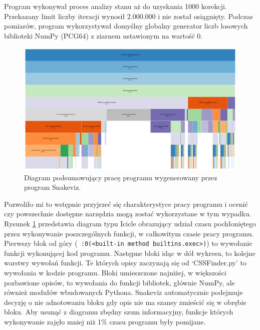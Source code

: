 \documentclass[11pt, a4paper]{article}
\newcommand{\code}[1]{\texttt{#1}}
\begin{document}
\begin{sloppypar}
    Program wykonywał proces analizy stanu aż do uzyskania 1000 korekcji. Przekazany
    limit liczby iteracji wynosił 2.000.000 i nie został osiągnięty. Podczas pomiarów, program
    wykorzystywał domyślny globalny generator liczb losowych biblioteki NumPy (PCG64\cite{NumpyDefaultGenerator})
    z ziarnem ustawionym na wartość 0.

    \FloatBarrier
    \begin{figure}[ht]
      \centering
      \includegraphics[width=1.0\textwidth]{"resources/profiling_1/graph.png"}
      \caption{Diagram podsumowujący pracę programu wygenerowany przez program Snakeviz.}
      \label{pre-prof-perf}
    \end{figure}
    \FloatBarrier

    Pozwoliło mi to wstępnie przyjrzeć się charakterystyce pracy programu i ocenić czy
    powszechnie dostępne narzędzia mogą zostać wykorzystane w tym wypadku. Rysunek \ref{pre-prof-perf}
    przedstawia diagram typu Icicle obrazujący udział czasu pochłoniętego przez wykonywanie
    poszczególnych funkcji, w całkowitym czasie pracy programu. Pierwszy blok od góry (\code{~:0(<built-in method builtins.exec>)})
    to wywołanie funkcji wykonującej kod programu. Następne bloki idąc w dół wykresu, to
    kolejne warstwy wywołań funkcji. Te których opisy zaczynają się od `CSSFinder.py' to
    wywołania w kodzie programu. Bloki umieszczone najniżej, w większości pozbawione opisów,
    to wywołania do funkcji bibliotek, głównie NumPy, ale również modułów wbudowanych
    Pythona. Snakeviz automatycznie podejmuje decyzję o nie adnotowaniu bloku gdy opis nie
    ma szansy zmieścić się w obrębie bloku. Aby usunąć z diagramu zbędny szum
    informacyjny, funkcje których wykonywanie zajęło mniej niż 1\% czasu programu były
    pomijane.


\end{sloppypar}
\end{document}
